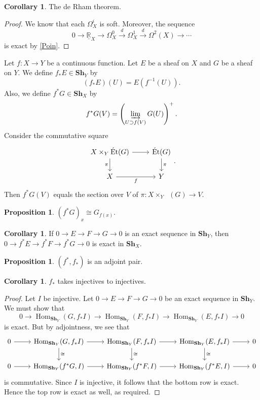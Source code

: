 \documentclass[10pt,letterpaper,cm]{nupset}
\theoremstyle{definition}
\theoremstyle{theorem}
\newtheorem{prop}[definition]{Proposition}
\newtheorem{corollary}[definition]{Corollary}
\theoremstyle{remark}
\newcommand{\R}{\mathbb{R}}
\newcommand{\1}{\mathbb{1}}
\newcommand{\0}{\vec 0}
\DeclareMathOperator{\Hom}{Hom}
\DeclareMathOperator{\Et}{\acute{E}t}
\begin{document}
\begin{corollary}
The de Rham theorem.
\end{corollary}
\begin{proof}
We know that each $\Omega_X^i$ is soft. Moreover, the sequence $$0 \to \underline{\R}_X \to \Omega_X^0 \overset{d}{\longrightarrow} \Omega_X^1 \overset{d}{\longrightarrow} \Omega^2(X) \to \cdots$$ is exact by \cref{Poin}.
\end{proof}

\medskip


Let $f :X \to Y$ be a continuous function. Let $E$ be a sheaf on $X$ and $G$ be a sheaf on $Y$. We define $f_{\ast}{E} \in \mathbf{Sh}_Y$ by $$\left(f_{\ast}{E}\right)(U) = E(f^{-1}(U)).$$ Also, we define $f^{\ast}{G} \in \mathbf{Sh}_X$ by $$f^{\ast}{G}(V) = \left(\varinjlim_{U \supset f(V)} G(U)\right)^{+}.$$ Consider the commutative square
\[\begin{tikzcd}
 X \times_Y \Et(G) \arrow[d, "\pi"'] \arrow[r] & \Et(G) \arrow[d, "\pi"] \\
X \arrow[r, "f"']                              & Y                      
\end{tikzcd}
.\] Then $f^{\ast}{G}(V)$ equals the section over $V$ of  $\pi : X \times_Y \Et(G) \to V$.


\begin{prop}
$\left(f^{\ast}{G}\right)_x \cong G_{f(x)}$.
\end{prop}

\begin{corollary}
If $0 \to E \to F \to G \to 0$ is an exact sequence in $\mathbf{Sh}_Y$, then $0 \to f^{\ast}{E} \to f^{\ast}{F} \to f^{\ast}{G} \to 0$ is exact in $\mathbf{Sh}_X$.
\end{corollary}

\begin{prop}
$\left(f^{\ast}, f_{\ast}\right)$ is an adjoint pair.
\end{prop}

\begin{corollary}
$f_{\ast}$ takes injectives to injectives.
\end{corollary}
\begin{proof}
Let $I$ be injective. Let $0 \to E \to F \to G \to 0$ be an exact sequence in $\mathbf{Sh}_Y$. We must show that $$ 0 \to \Hom_{\mathbf{Sh}_Y}(G, f_{\ast}I) \to \Hom_{\mathbf{Sh}_Y}(F, f_{\ast}I)   \to  \Hom_{\mathbf{Sh}_Y}(E, f_{\ast}I) \to 0  $$ is exact. But by adjointness, we see that
\[
\begin{tikzcd}
0 \arrow[r] & { \Hom_{\mathbf{Sh}_Y}(G, f_{\ast}I)} \arrow[r] \arrow[d, "\cong"] & { \Hom_{\mathbf{Sh}_Y}(F, f_{\ast}I)} \arrow[r] \arrow[d, "\cong"]         & { \Hom_{\mathbf{Sh}_Y}(E, f_{\ast}I)} \arrow[r] \arrow[d, "\cong"] & 0 \\
0 \arrow[r] & { \Hom_{\mathbf{Sh}_Y}(f^{\ast}G, I)} \arrow[r]                    &  {\Hom_{\mathbf{Sh}_Y}(f^{\ast}F, I)} \arrow[r] & { \Hom_{\mathbf{Sh}_Y}(f^{\ast}E, I)} \arrow[r]                    & 0
\end{tikzcd}
\] is commutative. Since $I$ is injective, it follows that the bottom row is exact. Hence the top row is exact as well, as required. 
\end{proof}
\end{document}
